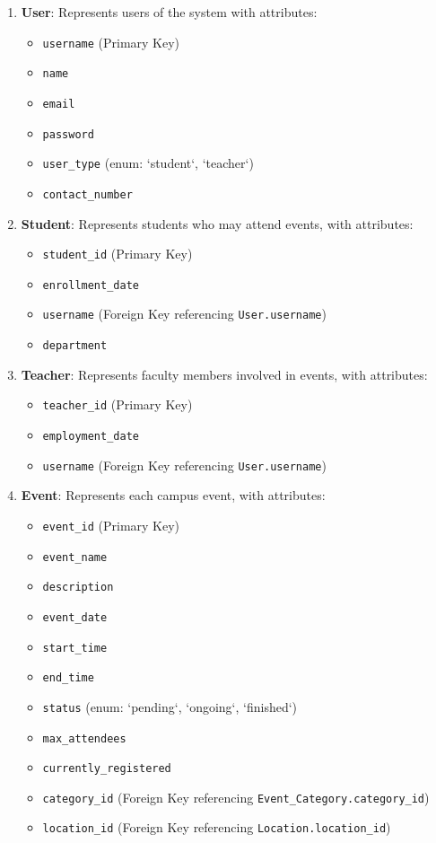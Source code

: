 \begin{enumerate}
    \item \textbf{User}: Represents users of the system with attributes:
    \begin{itemize}
        \item \texttt{username} (Primary Key)
        \item \texttt{name}
        \item \texttt{email}
        \item \texttt{password}
        \item \texttt{user\_type} (enum: `student`, `teacher`)
        \item \texttt{contact\_number}
    \end{itemize}

    \item \textbf{Student}: Represents students who may attend events, with attributes:
    \begin{itemize}
        \item \texttt{student\_id} (Primary Key)
        \item \texttt{enrollment\_date}
        \item \texttt{username} (Foreign Key referencing \texttt{User.username})
        \item \texttt{department}
    \end{itemize}

    \item \textbf{Teacher}: Represents faculty members involved in events, with attributes:
    \begin{itemize}
        \item \texttt{teacher\_id} (Primary Key)
        \item \texttt{employment\_date}
        \item \texttt{username} (Foreign Key referencing \texttt{User.username})
    \end{itemize}

    \item \textbf{Event}: Represents each campus event, with attributes:
    \begin{itemize}
        \item \texttt{event\_id} (Primary Key)
        \item \texttt{event\_name}
        \item \texttt{description}
        \item \texttt{event\_date}
        \item \texttt{start\_time}
        \item \texttt{end\_time}
        \item \texttt{status} (enum: `pending`, `ongoing`, `finished`)
        \item \texttt{max\_attendees}
        \item \texttt{currently\_registered}
        \item \texttt{category\_id} (Foreign Key referencing \texttt{Event\_Category.category\_id})
        \item \texttt{location\_id} (Foreign Key referencing \texttt{Location.location\_id})
    \end{itemize}


\end{enumerate}
